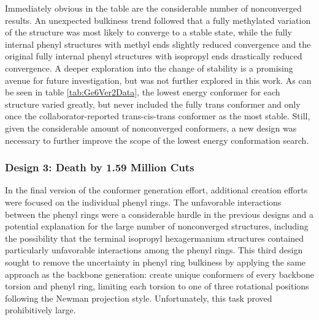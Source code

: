 Immediately obvious in the table are the considerable number of nonconverged results. 
An unexpected bulkiness trend followed that a fully methylated variation of the structure was most likely to converge to a stable state, while the fully internal phenyl structures with methyl ends slightly reduced convergence and the original fully internal phenyl structures with isopropyl ends drastically reduced convergence.
A deeper exploration into the change of stability is a promising avenue for future investigation, but was not further explored in this work.
As can be seen in table \ref{tab:Ge6Ver2Data}, the lowest energy conformer for each structure varied greatly, but never included the fully trans conformer and only once the collaborator-reported trans-cis-trans conformer as the most stable.
Still, given the considerable amount of nonconverged conformers, a new design was necessary to further improve the scope of the lowest energy conformation search.

\subsubsection{Design 3: Death by 1.59 Million Cuts}

In the final version of the conformer generation effort, additional creation efforts were focused on the individual phenyl rings. 
The unfavorable interactions between the phenyl rings were a considerable hurdle in the previous designs and a potential explanation for the large number of nonconverged structures, including the possibility that the terminal isopropyl hexagermanium structures contained particularly unfavorable interactions among the phenyl rings.
This third design sought to remove the uncertainty in phenyl ring bulkiness by applying the same approach as the backbone generation: create unique conformers of every backbone torsion and phenyl ring, limiting each torsion to one of three rotational positions following the Newman projection style. 
Unfortunately, this task proved prohibitively large.

